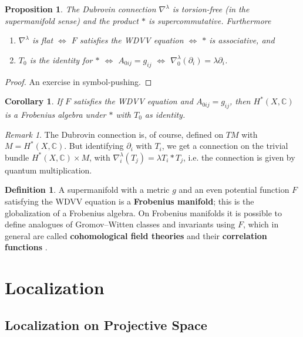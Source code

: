 \documentclass{report}
\theoremstyle{plain}
\newtheorem{proposition}[theorem]{Proposition}
\newtheorem{corollary}[theorem]{Corollary}
\theoremstyle{definition}
\newtheorem{definition}[theorem]{Definition}
\theoremstyle{remark}
\newtheorem*{remark}{Remark}
\newcommand{\di}{\partial}
\newcommand{\bC}{\mathbb{C}}
\begin{document}
\begin{proposition}
  The Dubrovin connection $\nabla^\lambda$ is torsion-free (in the
  supermanifold sense) and the product $*$ is supercommutative.
  Furthermore
  \begin{enumerate}
  \item $\nabla^\lambda$ is flat $\iff$ $F$ satisfies the WDVV
    equation $\iff$ $*$ is associative, and
  \item $T_0$ is the identity for $*$ $\iff$ $A_{0ij} = g_{ij}$ $\iff$
    $\nabla_0^\lambda(\di_i) = \lambda \di_i$.
  \end{enumerate}
\end{proposition}

\begin{proof}
  An exercise in symbol-pushing.
\end{proof}

\begin{corollary}
  If $F$ satisfies the WDVV equation and $A_{0ij} = g_{ij}$, then
  $H^*(X, \bC)$ is a Frobenius algebra under $*$ with $T_0$ as
  identity.
\end{corollary}

\begin{remark}
  The Dubrovin connection is, of course, defined on $TM$ with $M =
  H^*(X, \bC)$. But identifying $\di_i$ with $T_i$, we get a
  connection on the trivial bundle $H^*(X, \bC) \times M$, with
  $\nabla_i^\lambda(T_j) = \lambda T_i * T_j$, i.e. the connection is
  given by quantum multiplication.
\end{remark}

\begin{definition}
  A supermanifold with a metric $g$ and an even potential function $F$
  satisfying the WDVV equation is a {\bf Frobenius manifold}; this is
  the globalization of a Frobenius algebra. On Frobenius manifolds it
  is possible to define analogues of Gromov--Witten classes and
  invariants using $F$, which in general are called {\bf cohomological
    field theories} and their {\bf correlation functions}
  \cite{Manin1999}.
\end{definition}

\section{Localization}

\subsection{Localization on Projective Space}
\end{document}
